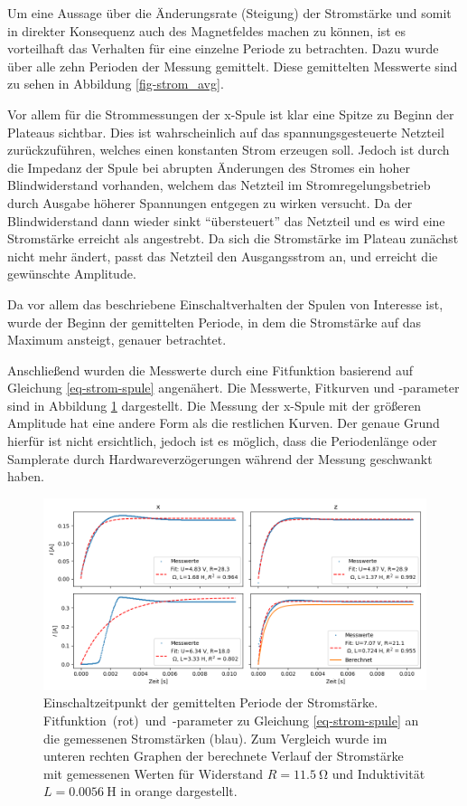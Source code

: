 \documentclass[page,pdftex,12pt,a4paper,twoside,openright]{scrbook}
\begin{document}
Um eine Aussage über die Änderungsrate (Steigung) der Stromstärke und somit in direkter Konsequenz auch des Magnetfeldes machen zu können, ist es vorteilhaft das Verhalten für eine einzelne Periode zu betrachten. Dazu wurde über alle zehn Perioden der Messung gemittelt. Diese gemittelten Messwerte sind zu sehen in Abbildung \ref{fig-strom_avg}.

Vor allem für die Strommessungen der x-Spule ist klar eine Spitze zu Beginn der Plateaus sichtbar. Dies ist wahrscheinlich auf das spannungsgesteuerte Netzteil zurückzuführen, welches einen konstanten Strom erzeugen soll. Jedoch ist durch die Impedanz der Spule bei abrupten Änderungen des Stromes ein hoher Blindwiderstand vorhanden, welchem das Netzteil im Stromregelungsbetrieb durch Ausgabe höherer Spannungen entgegen zu wirken versucht. Da der Blindwiderstand dann wieder sinkt "`übersteuert"' das Netzteil und es wird eine Stromstärke erreicht als angestrebt. Da sich die Stromstärke im Plateau zunächst nicht mehr ändert, passt das Netzteil den Ausgangsstrom an, und erreicht die gewünschte Amplitude.

Da vor allem das beschriebene Einschaltverhalten der Spulen von Interesse ist, wurde der Beginn der gemittelten Periode, in dem die Stromstärke auf das Maximum ansteigt, genauer betrachtet.

Anschließend wurden die Messwerte durch eine Fitfunktion basierend auf Gleichung \ref{eq-strom-spule} angenähert. Die Messwerte, Fitkurven und -parameter sind in Abbildung \ref{fig-stromfit} dargestellt. Die Messung der x-Spule mit der größeren Amplitude hat eine andere Form als die restlichen Kurven. Der genaue Grund hierfür ist nicht ersichtlich, jedoch ist es möglich, dass die Periodenlänge oder Samplerate durch Hardwareverzögerungen während der Messung geschwankt haben. 

\begin{figure}[h]
\centering
\includegraphics[width=\textwidth]{img/strom_fit.png}
\caption{\label{fig-stromfit}
Einschaltzeitpunkt der gemittelten Periode der Stromstärke. \mbox{Fitfunktion (rot) und -parameter} zu Gleichung \ref{eq-strom-spule} an die gemessenen Stromstärken (blau). Zum Vergleich wurde im unteren rechten Graphen der berechnete Verlauf der Stromstärke mit gemessenen Werten für Widerstand \(R = \SI{11.5}{\ohm}\) und Induktivität \(L = \SI{0.0056}{\henry}\) in orange dargestellt.}
\end{figure}
\end{document}
